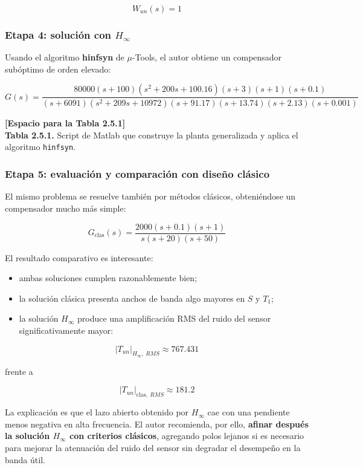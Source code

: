 $$
W_{un}(s)=1
$$

\subsubsection{Etapa 4: solución con \(H_\infty\)}
Usando el algoritmo \textbf{hinfsyn} de \(\mu\)-Tools, el autor obtiene un compensador subóptimo de orden elevado:

$$
G(s)=
\frac{80000(s+100)\left(s^2+200s+100.16\right)(s+3)(s+1)(s+0.1)}
{(s+6091)\left(s^2+209s+10972\right)(s+91.17)(s+13.74)(s+2.13)(s+0.001)}
$$

\textbf{[Espacio para la Tabla 2.5.1]}\\
\textbf{Tabla 2.5.1.} Script de Matlab que construye la planta generalizada y aplica el algoritmo \texttt{hinfsyn}.

\subsubsection{Etapa 5: evaluación y comparación con diseño clásico}
El mismo problema se resuelve también por métodos clásicos, obteniéndose un compensador mucho más simple:

$$
G_{\text{clas}}(s)=\frac{2000(s+0.1)(s+1)}{s(s+20)(s+50)}
$$

El resultado comparativo es interesante:

\begin{itemize}
  \item ambas soluciones cumplen razonablemente bien;
  \item la solución clásica presenta anchos de banda algo mayores en \(S\) y \(T_1\);
  \item la solución \(H_\infty\) produce una amplificación RMS del ruido del sensor significativamente mayor:
\end{itemize}

$$
|T_{un}|_{H_\infty,\ RMS}\approx 767.431
$$

frente a

$$
|T_{un}|_{\text{clas},\ RMS}\approx 181.2
$$

La explicación es que el lazo abierto obtenido por \(H_\infty\) cae con una pendiente menos negativa en alta frecuencia. El autor recomienda, por ello, \textbf{afinar después la solución \(H_\infty\) con criterios clásicos}, agregando polos lejanos si es necesario para mejorar la atenuación del ruido del sensor sin degradar el desempeño en la banda útil.

